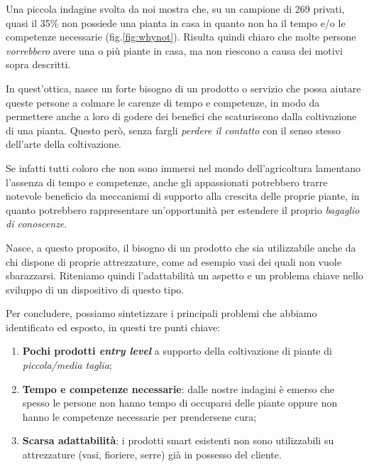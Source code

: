 Una piccola indagine svolta da noi mostra che, su un campione di 269 privati, quasi il 35\% non possiede una pianta in casa in quanto non ha il tempo e/o le competenze necessarie (fig.\ref{fig:whynot}).
Risulta quindi chiaro che molte persone \textit{vorrebbero} avere una o più piante in casa, ma non riescono a causa dei motivi sopra descritti.

In quest'ottica, nasce un forte bisogno di un prodotto o servizio che possa aiutare queste persone a colmare le carenze di tempo e competenze, in modo da permettere anche a loro di godere dei benefici che scaturiscono dalla coltivazione di una pianta. Questo però, senza fargli \textit{perdere il contatto} con il senso stesso dell'arte della coltivazione.

Se infatti tutti coloro che non sono immersi nel mondo dell'agricoltura lamentano l'assenza di tempo e competenze, anche gli appassionati potrebbero trarre notevole beneficio da meccanismi di supporto alla crescita delle proprie piante, in quanto potrebbero rappresentare un'opportunità per estendere il proprio\textit{ bagaglio di conoscenze}.

Nasce, a questo proposito, il bisogno di un prodotto che sia utilizzabile anche da chi dispone di proprie attrezzature, come ad esempio vasi dei quali non vuole sbarazzarsi.
Riteniamo quindi l'adattabilità un aspetto e un problema chiave nello sviluppo di un dispositivo di questo tipo.

Per concludere, possiamo sintetizzare i principali problemi che abbiamo identificato ed esposto, in questi tre punti chiave:
\begin{enumerate}
	\item \textbf{Pochi prodotti \textit{entry level}} a supporto della coltivazione di piante di \textit{piccola/media taglia};
	
	\item \textbf{Tempo e competenze necessarie}: dalle nostre indagini è emerso che spesso le persone non hanno tempo di occuparsi delle piante oppure non hanno le competenze necessarie per prendersene cura;
	
	\item \textbf{Scarsa adattabilità}: i prodotti smart esistenti non sono utilizzabili su attrezzature (vasi, fioriere, serre) già in possesso del cliente.
\end{enumerate}
